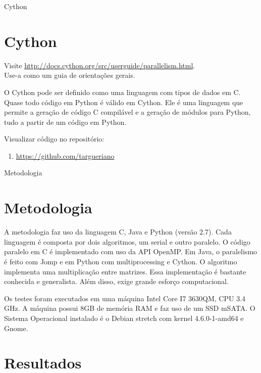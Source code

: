 \documentclass[aspectratio=169]{beamer}
\begin{document}
\begin{frame}{Cython}
\section{Cython}

Visite \url{http://docs.cython.org/src/userguide/parallelism.html}.\\ 
Use-a como um guia de orientações gerais.
\vspace{0.7cm}

O Cython pode ser definido como uma linguagem com tipos de dados em C. Quase todo código em Python é válido em Cython. Ele é uma linguagem que permite a geração de código C compilável e a geração de módulos para Python, tudo a partir de um código em Python. 

Visualizar código no repositório:
\begin{enumerate}
 \item \url{https://github.com/targueriano}
\end{enumerate}


\end{frame}

\begin{frame}{Metodologia}
\section{Metodologia}

A metodologia faz uso da linguagem C, Java e Python (versão 2.7). Cada linguagem é composta por dois algoritmos, um serial e outro paralelo. O código paralelo em C é implementado com uso da API OpenMP. Em Java, o paralelismo é feito com Jomp e em Python com multiprocessing e Cython. 
O algoritmo implementa uma multiplicação entre matrizes. Essa implementação é bastante conhecida e generalista. Além disso, exige grande esforço computacional.

Os testes foram executados em uma máquina Intel Core I7 3630QM, CPU 3.4 GHz. A máquina possui 8GB de memória RAM e faz uso de um SSD mSATA. O Sistema Operacional instalado é o Debian stretch com kernel 4.6.0-1-amd64 e Gnome.

\end{frame}

\section{Resultados}
\end{document}
